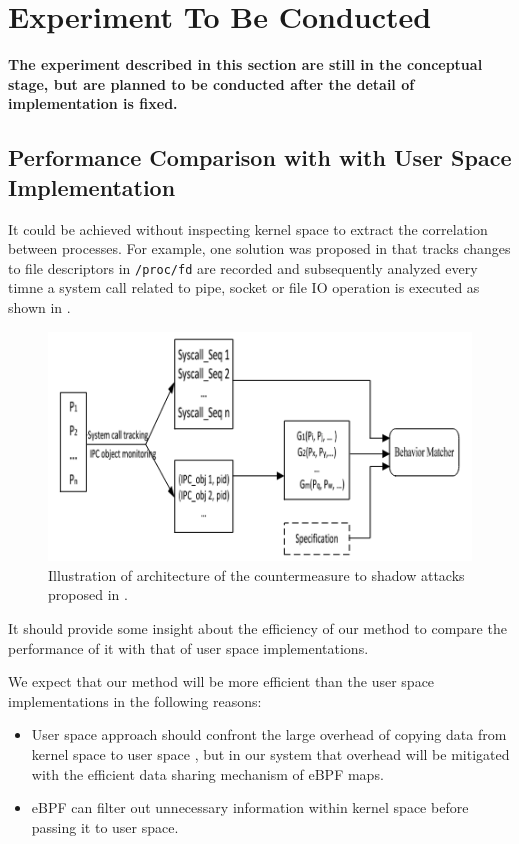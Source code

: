 \section{Experiment To Be Conducted}
\textbf{The experiment described in this section are still in the conceptual
  stage, but are planned to be conducted after the detail of implementation is fixed.}

\subsection{Performance Comparison with with User Space Implementation}
It could be achieved without inspecting kernel space to extract the correlation between processes.
For example, one solution was proposed in \cite{Weiqin:ShadowAttack} that
tracks changes to file descriptors in \texttt{/proc/fd} are recorded and subsequently analyzed
every timne a system call related to pipe, socket or file IO operation is executed as shown in .
\begin{figure}[tp]
  \begin{center}
    \includegraphics[width=\columnwidth]{./img/old_method.png}
  \end{center}
  \caption{Illustration of architecture of the countermeasure to shadow attacks proposed in
    \cite{Weiqin:ShadowAttack}.}
  \label{img:old-method}
\end{figure}
It should provide some insight about the efficiency of our method to compare the performance of it
with that of user space implementations.

We expect that our method will be more efficient than the user space implementations in the following reasons:
\begin{itemize}
  \item User space approach should confront the large overhead of copying data from kernel space to user space
        \cite{Weiqin:ShadowAttack,jia2023programmable}, but
        in our system that overhead will be mitigated with the efficient data sharing mechanism of eBPF maps.

  \item eBPF can filter out unnecessary information within kernel space before passing it to user space.
\end{itemize}

